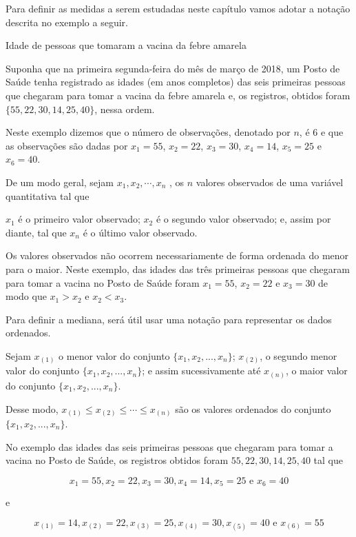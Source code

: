 Para definir as medidas a serem estudadas neste capítulo vamos adotar a notação descrita no exemplo a seguir.

\begin{example}{Idade de pessoas que tomaram a vacina da febre amarela}

Suponha que na primeira segunda-feira do mês de março de 2018, um Posto de Saúde tenha registrado as idades (em anos completos) das seis primeiras pessoas que chegaram para tomar a vacina da febre amarela e, os registros, obtidos foram \(\{55, 22, 30, 14, 25, 40\}\), nessa ordem.

 Neste exemplo dizemos que o número de observações, denotado por \(n\), é \(6\) e que as observações são dadas por \(x_1=55\), \(x_2=22\), \(x_3=30\), \(x_4=14\), \(x_5=25\) e \(x_6=40\).

De um modo geral, sejam \(x_1,x_2, \cdots, x_n\) , os \(n\) valores observados de uma variável quantitativa tal que

\(x_1\) é o primeiro valor observado; \(x_2\) é o segundo valor observado; e, assim por diante, tal que \(x_n\) é o último valor observado.

Os valores observados não ocorrem necessariamente de forma ordenada do menor para o maior. Neste exemplo, das idades das três primeiras pessoas que chegaram para tomar a vacina no Posto de Saúde foram \(x_1=55\), \(x_2=22\) e \(x_3=30\) de modo que \(x_1>x_2\) e \(x_2<x_3\).

Para definir a mediana, será útil usar uma notação para representar os dados ordenados.

Sejam \(x_{(1)}\) o menor valor do conjunto \(\{ x_1,x_2,...,x_n\}\); \(x_{(2)}\), o segundo menor valor do conjunto \(\{ x_1,x_2,...,x_n\}\); e assim sucessivamente até \(x_{(n)}\), o maior valor do conjunto \(\{ x_1,x_2,...,x_n\}\).

Desse modo,
\(x_{(1)}\leq x_{(2)}\leq \cdots\leq x_{(n)}\) são os valores ordenados do conjunto \(\{ x_1,x_2,...,x_n\}\).

No exemplo das idades das seis primeiras pessoas que chegaram para tomar a vacina no Posto de Saúde, os registros obtidos foram \(55, 22, 30, 14, 25, 40\) tal que

$$x_1=55, x_2=22, x_3=30, x_4=14, x_5=25 \text{ e } x_6=40$$

e

$$x_{(1)}=14, x_{(2)}=22, x_{(3)}=25, x_{(4)}=30, x_{(5)}=40 \text{ e } x_{(6)}=55$$

\end{example}

